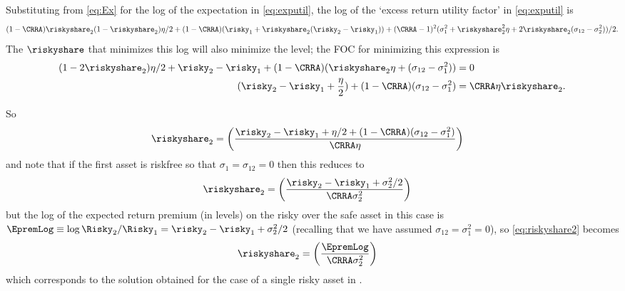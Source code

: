 Substituting from \eqref{eq:Ex} for the log of the expectation in \eqref{eq:exputil},
the log of the `excess return utility factor' in \eqref{eq:exputil} is
\begin{equation*}
  (1-\CRRA)\riskyshare_2(1-\riskyshare_2)\eta/2+(1-\CRRA) (\risky_1+\riskyshare_2(\risky_2-\risky_1))+(\CRRA-1)^2 (\sigma_1^2+\riskyshare_2^2 \eta+2\riskyshare_2(\sigma_{12}-\sigma_2^2))/2
.
\end{equation*}
The $\riskyshare$ that minimizes this log will also minimize the level; the FOC
for minimizing this expression is
\begin{equation}\begin{gathered}\begin{aligned}
         (1-2\riskyshare_2)\eta/2+ \risky_2-\risky_1+(1-\CRRA) (\riskyshare_2 \eta+(\sigma_{12}-\sigma_1^2)) & =  0 \\
         \quad(\risky_2-\risky_1+\frac{\eta}{2})+(1-\CRRA) (\sigma_{12}-\sigma_1^2) & = \CRRA \eta \riskyshare_2.
         \label{eq:riskyshareMS}
\end{aligned}\end{gathered}\end{equation}

So
\begin{equation}\begin{gathered}\begin{aligned}
\riskyshare_2 & =  \left(\frac{\risky_2-\risky_1+\eta/2+(1-\CRRA)(\sigma_{12}-\sigma_1^2)}{\CRRA\eta}\right)
\end{aligned}\end{gathered}\end{equation}
and note that if the first asset is riskfree so that $\sigma_{1}=\sigma_{12}=0$ then this reduces to
\begin{equation}\begin{gathered}\begin{aligned}
\riskyshare_2 & =  \left(\frac{\risky_2-\risky_1+\sigma^{2}_{2}/2}{\CRRA\sigma^{2}_{2}}\right) \label{eq:riskyshare2}
\end{aligned}\end{gathered}\end{equation}
but the log of the expected return premium (in levels) on the risky over the safe asset in this case is $\EpremLog \equiv \log \Risky_{2}/\Risky_{1} = \risky_{2}-\risky_{1}+\sigma^{2}_{2}/2$
(recalling that we have assumed $\sigma_{12}=\sigma^{2}_{1}=0$), so \eqref{eq:riskyshare2} becomes
\begin{equation}\begin{gathered}\begin{aligned}
\riskyshare_2 & =  \left(\frac{\EpremLog}{\CRRA\sigma^{2}_{2}}\right)
\end{aligned}\end{gathered}\end{equation}
which corresponds to the solution obtained for the case of a single risky asset in .


